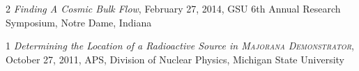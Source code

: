 \documentclass[margin]{res}
\begin{document}
\begin{resume}
\hangindent=15pt {\footnotesize \textcolor{light-gray}{2}} 
{\sl Finding A Cosmic Bulk Flow}, February 27, 2014, GSU 6th Annual Research Symposium, Notre Dame, Indiana
\vspace{-12pt}

\hangindent=15pt {\footnotesize \textcolor{light-gray}{1}} 
{\sl Determining the Location of a Radioactive Source in \textsc{Majorana Demonstrator}}, October 27, 2011, APS, Division of Nuclear Physics, Michigan State University 


\begin{comment}
\href{https://ui.adsabs.harvard.edu/#abs/2017AAS...22943402R/abstract}{{\sl Correlations Between Hubble Residuals and Local Stellar Populations}} \hfill {\bf January 7, 2017} \\
\textit{of Type Ia Supernovae}\\
AAS 229th Meeting, Grapevine, Texas

\href{https://ui.adsabs.harvard.edu/#abs/2016AAS...22723711R/abstract}{{\sl Correlating Type Ia Supernova Properties With Their Local}} \hfill {\bf January 6, 2016} \\
\textit{Environment Using HST Snapshots of Host Galaxies} \\
AAS 227th Meeting, Kissimmee, Florida

{\sl Prospects for Detecting a Cosmic Bulk Flow} \hfill {\bf January 6, 2015}\\
AAS 225th Meeting, Seattle, Washington  

{\sl Finding A Cosmic Bulk Flow}\hfill {\bf February 27, 2014}\\
GSU 6th Annual Research Symposium, Notre Dame 

{\sl Determining the Location of a Radioactive Source in \textsc{Majorana}} \hfill {\bf October 27, 2011}\\
\textit{\textsc{Demonstrator}} \\
APS, Division of Nuclear Physics, Michigan State University 





\end{comment}
\end{resume}
\end{document}
